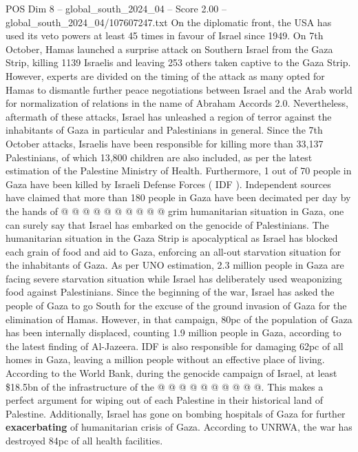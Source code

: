 \begin{textsample}{POS Dim 8 – global\_south\_2024\_04 – Score 2.00 – global\_south\_2024\_04/107607247.txt}  \label{ex:f8_pos_420}
On the diplomatic front, the USA has used its veto powers at least 45 times in favour of Israel since 1949.
On 7th October, Hamas launched a surprise attack on Southern Israel from the Gaza Strip, killing 1139 Israelis and leaving 253 others taken captive to the Gaza Strip.
However, experts are divided on the timing of the attack as many opted for Hamas to dismantle further peace negotiations between Israel and the Arab world for normalization of relations in the name of Abraham Accords 2.0.
Nevertheless, aftermath of these attacks, Israel has unleashed a region of terror against the inhabitants of Gaza in particular and Palestinians in general.
Since the 7th October attacks, Israelis have been responsible for killing more than 33,137 Palestinians, of which 13,800 children are also included, as per the latest estimation of the Palestine Ministry of Health.
Furthermore, 1 out of 70 people in Gaza have been killed by Israeli Defense Forces ( IDF ).
Independent sources have claimed that more than 180 people in Gaza have been decimated per day by the hands of @ @ @ @ @ @ @ @ @ @ grim humanitarian situation in Gaza, one can surely say that Israel has embarked on the genocide of Palestinians.
The humanitarian situation in the Gaza Strip is apocalyptical as Israel has blocked each grain of food and aid to Gaza, enforcing an all-out starvation situation for the inhabitants of Gaza.
As per UNO estimation, 2.3 million people in Gaza are facing severe starvation situation while Israel has deliberately used weaponizing food against Palestinians.
Since the beginning of the war, Israel has asked the people of Gaza to go South for the excuse of the ground invasion of Gaza for the elimination of Hamas.
However, in that campaign, 80pc of the population of Gaza has been internally displaced, counting 1.9 million people in Gaza, according to the latest finding of Al-Jazeera.
IDF is also responsible for damaging 62pc of all homes in Gaza, leaving a million people without an effective place of living.
According to the World Bank, during the genocide campaign of Israel, at least \$18.5bn of the infrastructure of the @ @ @ @ @ @ @ @ @ @.
This makes a perfect argument for wiping out of each Palestine in their historical land of Palestine.
Additionally, Israel has gone on bombing hospitals of Gaza for further \textbf{exacerbating} of humanitarian crisis of Gaza.
According to UNRWA, the war has destroyed 84pc of all health facilities.

\end{textsample}
